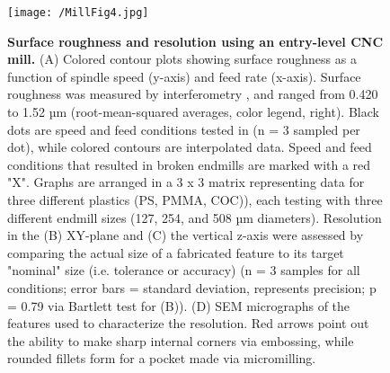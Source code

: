 {\begin{figure}[ht!] %
\centering
\texttt{[image: /MillFig4.jpg]}
\caption[\textbf{Surface roughness and resolution using an entry-level CNC mill.}]{\textbf{Surface roughness and resolution using an entry-level CNC mill.} (A) Colored contour plots showing surface roughness as a function of spindle speed (y-axis) and feed rate (x-axis). Surface roughness was measured by interferometry , and ranged from 0.420 to 1.52 µm (root-mean-squared averages, color legend, right). Black dots are speed and feed conditions tested in (n = 3 sampled per dot), while colored contours are interpolated data. Speed and feed conditions that resulted in broken endmills are marked with a red "X". Graphs are arranged in a 3 x 3 matrix representing data for three different plastics (PS, PMMA, COC)), each testing with three different endmill sizes (127, 254, and 508 µm diameters). Resolution in the (B) XY-plane and (C) the vertical z-axis were assessed by comparing the actual size of a fabricated feature to its target "nominal" size (i.e. tolerance or accuracy) (n = 3 samples for all conditions; error bars = standard deviation, represents precision; p = 0.79 via Bartlett test for (B)). (D) SEM micrographs of the features used to characterize the resolution. Red arrows point out the ability to make sharp internal corners via embossing, while rounded fillets form for a pocket made via micromilling.}
\label{figure:MillFig4}
\end{figure}
\FloatBarrier


}
